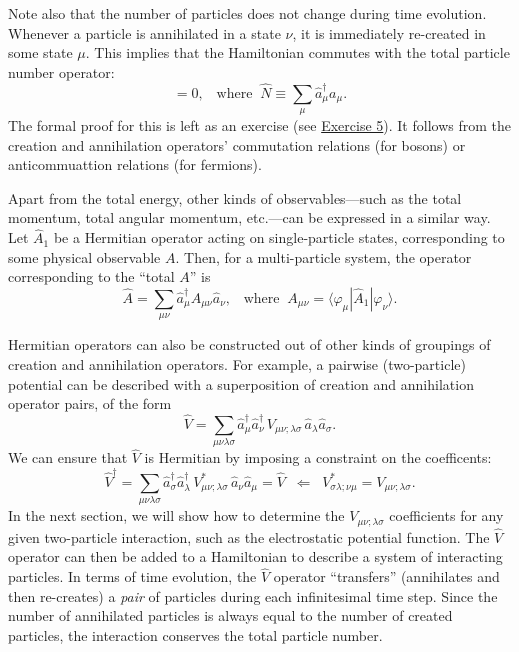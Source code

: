 \documentclass[pra,12pt]{revtex4}
\begin{document}
Note also that the number of particles does not change during time
evolution.  Whenever a particle is annihilated in a state $\nu$, it is
immediately re-created in some state $\mu$.  This implies that the
Hamiltonian commutes with the total particle number operator:
\begin{equation}
  [\hat{H}, \hat{N}] = 0, \;\;\;\mathrm{where}\;\;\hat{N} \equiv \sum_\mu \hat{a}_\mu^\dagger a_\mu.
\end{equation}
The formal proof for this is left as an exercise (see
\hyperref[ex:n_conserved]{Exercise 5}).  It follows from the creation
and annihilation operators' commutation relations (for bosons) or
anticommuattion relations (for fermions).

Apart from the total energy, other kinds of observables---such as the
total momentum, total angular momentum, etc.---can be expressed in a
similar way.  Let $\hat{A}_1$ be a Hermitian operator acting on
single-particle states, corresponding to some physical observable $A$.
Then, for a multi-particle system, the operator corresponding to the
``total $A$'' is
\begin{equation}
  \hat{A} = \sum_{\mu\nu} \hat{a}^\dagger_\mu A_{\mu\nu} \hat{a}_\nu, \;\;\; \mathrm{where}\;\; A_{\mu\nu} = \langle\varphi_\mu|\hat{A}_1|\varphi_\nu\rangle.
\end{equation}

Hermitian operators can also be constructed out of other kinds of
groupings of creation and annihilation operators.  For example, a
pairwise (two-particle) potential can be described with a
superposition of creation and annihilation operator pairs, of the form
\begin{equation}
  \hat{V} = \sum_{\mu\nu\lambda\sigma} \hat{a}^\dagger_\mu \hat{a}^\dagger_\nu \, V_{\mu\nu;\lambda\sigma}\, \hat{a}_\lambda \hat{a}_\sigma.
\end{equation}
We can ensure that $\hat{V}$ is Hermitian by imposing a
constraint on the coefficents:
\begin{equation}
  \hat{V}^\dagger = \sum_{\mu\nu\lambda\sigma} \hat{a}^\dagger_\sigma \hat{a}^\dagger_\lambda \, V_{\mu\nu;\lambda\sigma}^* \, \hat{a}_\nu \hat{a}_\mu = \hat{V} \;\;\Leftarrow \;\; V_{\sigma\lambda;\nu\mu}^* = V_{\mu\nu;\lambda\sigma}.
\end{equation}
In the next section, we will show how to determine the
$V_{\mu\nu;\lambda\sigma}$ coefficients for any given two-particle
interaction, such as the electrostatic potential function.  The
$\hat{V}$ operator can then be added to a Hamiltonian to describe a
system of interacting particles.  In terms of time evolution, the
$\hat{V}$ operator ``transfers'' (annihilates and then re-creates) a
\textit{pair} of particles during each infinitesimal time step.  Since
the number of annihilated particles is always equal to the number of
created particles, the interaction conserves the total particle
number.
\end{document}
